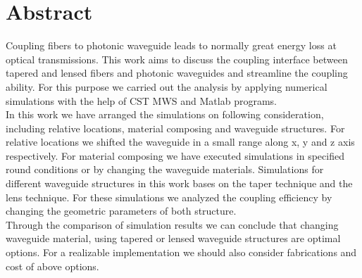 \chapter*{Abstract}
\label{cha:kurzfassung}
Coupling fibers to photonic waveguide leads to normally great energy loss at optical transmissions. This work aims to discuss the coupling interface between tapered and lensed fibers and photonic waveguides and streamline the coupling ability. For this purpose we carried out the analysis by applying numerical simulations with the help of CST MWS and Matlab programs. \\
In this work we have arranged the simulations on following consideration, including relative locations, material composing and waveguide structures. For relative locations we shifted the waveguide in a small range along x, y and z axis respectively. For material composing we have executed simulations in specified round conditions or by changing the waveguide materials.  Simulations for different waveguide structures in this work bases on the taper technique and the lens technique. For these simulations we analyzed the coupling efficiency by changing the geometric parameters of both structure.\\
Through the comparison of simulation results we can conclude that changing waveguide material, using tapered or lensed waveguide structures are optimal options. For a realizable implementation we should also consider fabrications and cost of above options.
